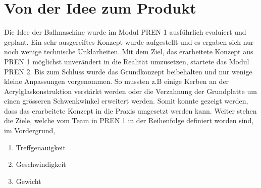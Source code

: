 \section{Von der Idee zum Produkt}
Die Idee der Ballmaschine wurde im Modul PREN 1 ausführlich evaluiert und geplant. 
Ein sehr ausgereiftes Konzept wurde aufgestellt und es ergaben sich nur noch wenige 
technische Unklarheiten. Mit dem Ziel, das erarbeitete Konzept aus PREN 1 möglichst 
unverändert in die Realität umzusetzen, startete das Modul PREN 2.
Bis zum Schluss wurde das Grundkonzept beibehalten und nur wenige kleine Anpassungen 
vorgenommen. So mussten z.B einige Kerben an der Acrylglaskonstruktion verstärkt werden
oder die Verzahnung der Grundplatte um einen grösseren Schwenkwinkel erweitert werden. 
Somit konnte gezeigt werden, dass das erarbeitete Konzept in die Praxis umgesetzt 
werden kann. Weiter stehen die Ziele, welche vom Team in PREN 1 in der Reihenfolge definiert 
worden sind, im Vordergrund,
\begin{enumerate}
	\item Treffgenauigkeit
	\item Geschwindigkeit
	\item Gewicht
\end{enumerate}